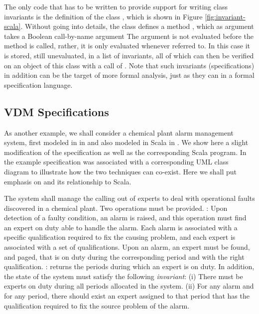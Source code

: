 The only code that has to be written to provide support for 
writing
class invariants is the definition of the class , 
which is shown in Figure \ref{fig:invariant-scala}. Without going 
into details, the class defines a method ,
which as argument takes a Boolean call-by-name argument 
The argument is not evaluated before the method is called, 
rather, it is only evaluated whenever referred to. In this case
it is stored, still unevaluated, in a list of invariants, all
of which can then be verified on an object of this class 
with a call of . Note that such invariants
(specifications) in addition can be the target of more formal analysis, just as they can in a formal specification language.


\subsection{VDM Specifications}
\label{sec:vdm-in-scala}

As another example, we shall consider a chemical plant alarm 
management system, first modeled in \vdmpp{} in 
\cite{vdmplusplus05} and also modeled in Scala in 
\cite{?}. We show here a slight modification of 
the \vdmpp{} specification as well as the 
corresponding Scala program. In \cite{vdmplusplus05}
the example specification was associated with 
a corresponding UML class diagram to illustrate how the two
techniques can co-exist. Here we shall put emphasis on
\vdmpp{} and its relationship to Scala.

The system shall manage the calling out of experts to deal with 
operational faults discovered in a 
chemical plant. 
Two operations must be provided.
: Upon detection of a faulty condition, an 
alarm is raised, and this operation must find an expert on duty 
able to handle the alarm. Each alarm is associated with a specific 
qualification required to fix the causing
problem, and each expert is associated with a set of 
qualifications. Upon an alarm, an expert must be found, and paged, 
that is on duty during the corresponding period and with the right 
qualification.    
: returns the periods during 
which an expert is on duty.      
In addition, the state of the system must satisfy the following
{\em invariant}:
(i) There must be experts on duty during all periods 
allocated in the system. 
(ii) For any alarm and for any period, there should exist an 
expert assigned to that period that has the qualification required
to fix the source problem of the alarm.

